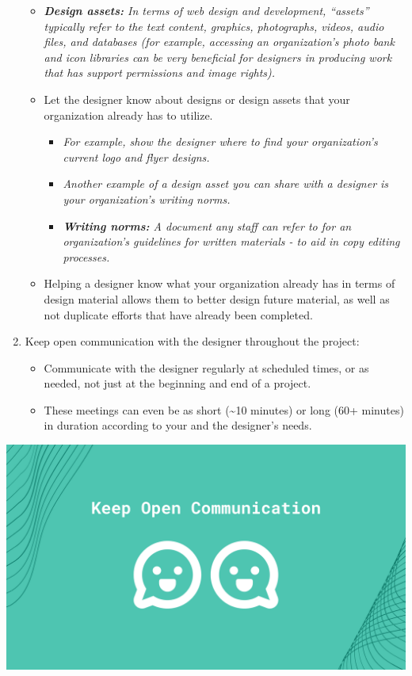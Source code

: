 \documentclass[
]{book}
\providecommand{\tightlist}{%
  \setlength{\itemsep}{0pt}\setlength{\parskip}{0pt}}
\begin{document}
\begin{enumerate}
  \begin{itemize}
  \tightlist
  \item
    \emph{\textbf{Design assets:} In terms of web design and development, ``assets'' typically refer to the text content, graphics, photographs, videos, audio files, and databases (for example, accessing an organization's photo bank and icon libraries can be very beneficial for designers in producing work that has support permissions and image rights).}
  \item
    Let the designer know about designs or design assets that your organization already has to utilize.

    \begin{itemize}
    \tightlist
    \item
      \emph{For example, show the designer where to find your organization's current logo and flyer designs.}
    \item
      \emph{Another example of a design asset you can share with a designer is your organization's writing norms.}
    \item
      \emph{\textbf{Writing norms:} A document any staff can refer to for an organization's guidelines for written materials - to aid in copy editing processes.}
    \end{itemize}
  \item
    Helping a designer know what your organization already has in terms of design material allows them to better design future material, as well as not duplicate efforts that have already been completed.
  \end{itemize}
\item
  Keep open communication with the designer throughout the project:

  \begin{itemize}
  \tightlist
  \item
    Communicate with the designer regularly at scheduled times, or as needed, not just at the beginning and end of a project.
  \item
    These meetings can even be as short (\textasciitilde10 minutes) or long (60+ minutes) in duration according to your and the designer's needs.
  \end{itemize}
\end{enumerate}

\includegraphics{images/Working-With-Graphic-Designers-Graphic-1.png}
\end{document}
